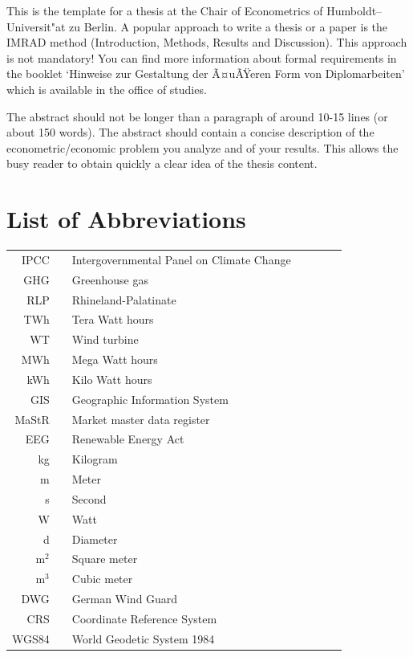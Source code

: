 \documentclass[a4paper,11pt]{article}
\begin{document}
This is the template for a thesis at the Chair of Econometrics of
Humboldt--Universit"at zu Berlin. A popular approach to write a thesis or a
paper is the IMRAD method (Introduction, Methods, Results and Discussion). This
approach is not mandatory! You can find more information about formal
requirements in the booklet `Hinweise zur Gestaltung der Ã¤uÃŸeren Form von
Diplomarbeiten' which is available in the office of studies.

The abstract should not be longer than a paragraph of around 10-15 lines (or
about 150 words). The abstract should contain a concise description of the
econometric/economic problem you analyze and of your results. This allows the
busy reader to obtain quickly a clear idea of the thesis content.

\newpage
\hypertarget{list-of-abbreviations}{%
\section*{List of Abbreviations}\label{list-of-abbreviations}}
\begin{tabular}{rp{0.2cm}lp{1cm}rp{0.2cm}l}
    IPCC    & &  Intergovernmental Panel on Climate Change \\
    GHG & & Greenhouse gas \\  
    RLP     & &  Rhineland-Palatinate \\
    TWh     & &  Tera Watt hours  \\
    WT      & &  Wind turbine  \\
    MWh     & &  Mega Watt hours \\
    kWh     & &  Kilo Watt hours \\
    GIS     & &  Geographic Information System \\
    MaStR   & &  Market master data register \\
    EEG     & &  Renewable Energy Act \\
    kg      & &  Kilogram \\
    m       & &  Meter \\
    s       & &  Second \\
    W       & &  Watt \\
    d       & &  Diameter \\
    m$^2$   & &  Square meter \\
    m$^3$   & &  Cubic meter \\
    DWG     & &  German Wind Guard \\
    CRS     & &  Coordinate Reference System \\
    WGS84   & &  World Geodetic System 1984 \\ 
    
\end{tabular}
\newpage
\listoffigures
{}
\end{document}
